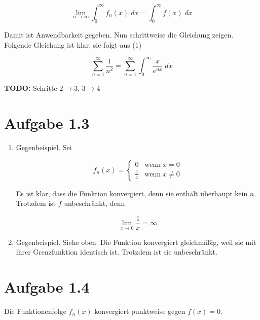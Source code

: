 \documentclass[a4paper,german,12pt,smallheadings]{scrartcl}
\begin{document}
\begin{enumerate}[(1)]
  \begin{equation*}
    \lim_{n \to \infty} \int_0^\infty f_n(x) \; dx = \int_0^\infty f(x) \; dx
  \end{equation*}

  Damit ist Anwendbarkeit gegeben. Nun schrittweise die Gleichung zeigen.
  Folgende Gleichung ist klar, sie folgt aus (1)

  \begin{equation*}
    \sum_{n=1}^\infty \frac{1}{n^2} = \sum_{n=1}^\infty \int_0^\infty \frac{x}{e^{nx}} \; dx
  \end{equation*}

  \textbf{TODO:} Schritte $2 \to 3$, $3 \to 4$

\end{enumerate}

\section*{Aufgabe 1.3}

\begin{enumerate}[(1)]
\item Gegenbeispiel. Sei

\begin{equation*}
  f_n(x) = \begin{cases} 
    0           & \mbox{wenn} \; x = 0 \\
    \frac{1}{x} & \mbox{wenn} \; x \neq 0
  \end{cases}
\end{equation*}

Es ist klar, dass die Funktion konvergiert, denn sie enthält überhaupt kein
$n$. Trotzdem ist $f$ unbeschränkt, denn

\begin{equation*}
  \lim_{x \to 0} \frac{1}{x} = \infty
\end{equation*}

\item Gegenbeispiel. Siehe oben. Die Funktion konvergiert gleichmäßig,
  weil sie mit ihrer Grenzfunktion identisch ist. Trotzdem ist sie
  unbeschränkt.

\end{enumerate}

\section*{Aufgabe 1.4}

Die Funktionenfolge $f_n(x)$ konvergiert punktweise gegen $f(x) = 0$.
\end{document}
